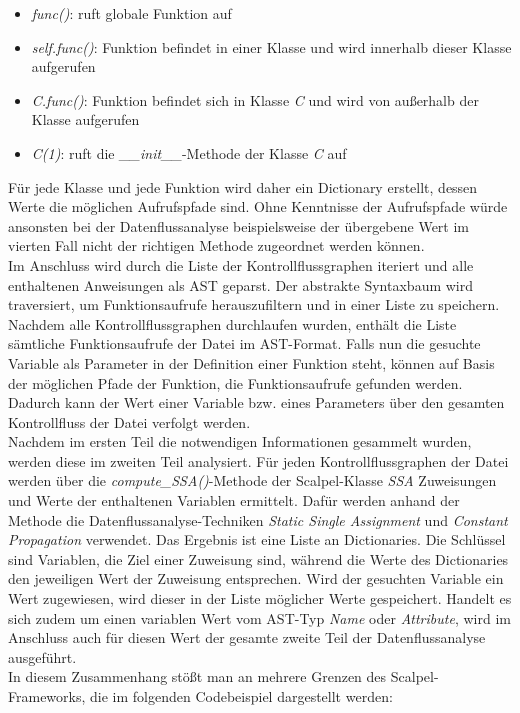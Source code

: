 \documentclass[german,bachelor]{swsLeipzig}
\begin{document}
\begin{itemize}
 \item \textit{func()}: ruft globale Funktion auf
 \item \textit{self.func()}: Funktion befindet in einer Klasse und wird innerhalb dieser Klasse aufgerufen
 \item \textit{C.func()}: Funktion befindet sich in Klasse \textit{C} und wird von außerhalb der Klasse aufgerufen
 \item \textit{C(1)}: ruft die \textit{\_\_init\_\_}-Methode der Klasse \textit{C} auf
\end{itemize}

\noindent Für jede Klasse und jede Funktion wird daher ein Dictionary erstellt, dessen Werte die möglichen Aufrufspfade sind.
Ohne Kenntnisse der Aufrufspfade würde ansonsten bei der Datenflussanalyse beispielsweise der übergebene Wert im vierten Fall
nicht der richtigen Methode zugeordnet werden können.\\
\indent Im Anschluss wird durch die Liste der Kontrollflussgraphen iteriert und alle enthaltenen Anweisungen als AST geparst.
Der abstrakte Syntaxbaum wird traversiert, um Funktionsaufrufe herauszufiltern und in einer Liste zu speichern.
Nachdem alle Kontrollflussgraphen durchlaufen wurden, enthält die Liste sämtliche Funktionsaufrufe der Datei im AST-Format.
Falls nun die gesuchte Variable als Parameter in der Definition einer Funktion steht, können auf Basis der möglichen Pfade
der Funktion, die Funktionsaufrufe gefunden werden.
Dadurch kann der Wert einer Variable bzw. eines Parameters über den gesamten Kontrollfluss der Datei verfolgt werden.\\

\noindent Nachdem im ersten Teil die notwendigen Informationen gesammelt wurden, werden diese im zweiten Teil analysiert.
Für jeden Kontrollflussgraphen der Datei werden über die \textit{compute\_SSA()}-Methode der Scalpel-Klasse \textit{SSA} Zuweisungen
und Werte der enthaltenen Variablen ermittelt.
Dafür werden anhand der Methode die Datenflussanalyse-Techniken \textit{Static Single Assignment} und \textit{Constant Propagation}
verwendet.
Das Ergebnis ist eine Liste an Dictionaries.
Die Schlüssel sind Variablen, die Ziel einer Zuweisung sind, während die Werte des Dictionaries den jeweiligen Wert der Zuweisung
entsprechen.
Wird der gesuchten Variable ein Wert zugewiesen, wird dieser in der Liste möglicher Werte gespeichert.
Handelt es sich zudem um einen variablen Wert vom AST-Typ \textit{Name} oder \textit{Attribute}, wird im Anschluss auch für diesen Wert
der gesamte zweite Teil der Datenflussanalyse ausgeführt.\\
\indent In diesem Zusammenhang stößt man an mehrere Grenzen des Scalpel-Frameworks, die im folgenden Codebeispiel dargestellt werden:\\
\end{document}
